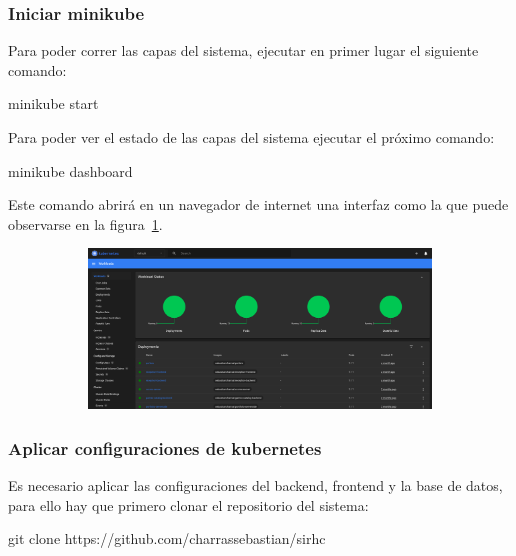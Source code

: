 \documentclass{article}
\begin{document}
\subsubsection{Iniciar minikube}
Para poder correr las capas del sistema, ejecutar en primer lugar el siguiente comando:

minikube start

Para poder ver el estado de las capas del sistema ejecutar el próximo comando:

minikube dashboard

Este comando abrirá en un navegador de internet una interfaz como la que puede observarse en la figura~\ref{fig:kubernetesDashboard}.
\begin{figure}[H]
	\caption{Interfaz del dashboard de Kubernetes}
    \begin{subfigure}{1\textwidth}
	\includegraphics[width=1\textwidth]{kubernetesDashboard.png}
    \end{subfigure}
	\label{fig:kubernetesDashboard}
\end{figure}
\vspace{-1.0\baselineskip}

\subsubsection{Aplicar configuraciones de kubernetes}
Es necesario aplicar las configuraciones del backend, frontend y la base de datos, para ello hay que primero clonar el repositorio del sistema:

git clone https://github.com/charrassebastian/sirhc
\end{document}
